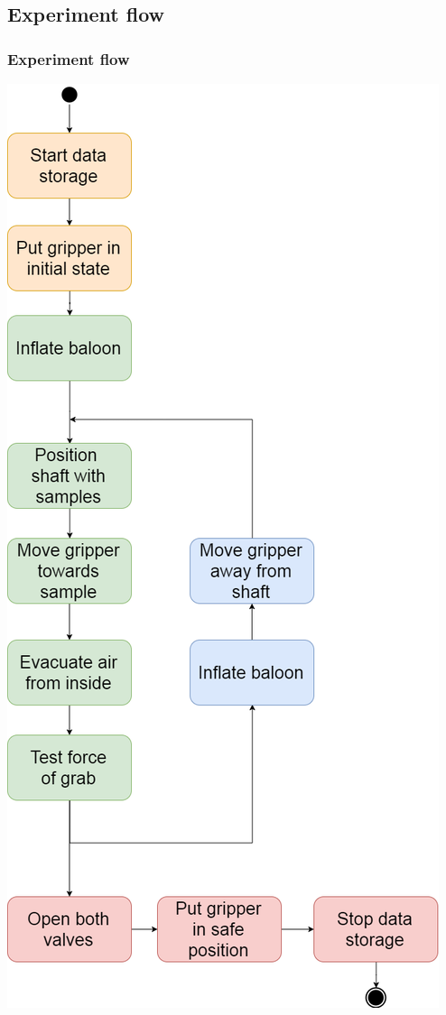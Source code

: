 \documentclass[xcolor=dvipsnames]{beamer}%
\begin{document}
\subsection{Experiment flow}
\begin{frame}
\frametitle{Experiment flow}
\begin{multicols}{2}
{
\hspace{1cm}
\includegraphics[height=0.8\textheight]{figure/FlowDiagram.png}
}


\end{multicols}
\end{frame}
\end{document}
